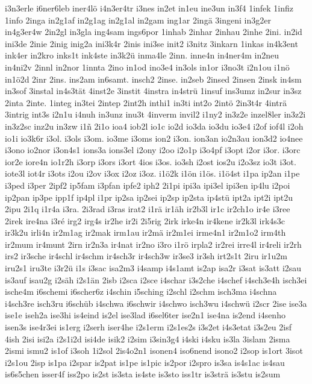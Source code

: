 {i3n3erle
i6ner6leb
iner4lö
i4n3er4tr
i3nes
in2et
in1eu
ine3un
in3f4
1infek
1infiz
1info
2inga
in2g1af
in2g1ag
in2g1al
in2gam
ing1ar
2ingä
3ingeni
in3g2er
in4g3er4w
2in2gl
in3gla
ing4sam
ings6por
1inhab
2inhar
2inhau
2inhe
2ini.
in2id
ini3de
2inie
2inig
inig2a
ini3k4r
2inis
ini3se
init2
i3nitz
3inkarn
1inkas
in4k3ent
ink4er
in2kro
inks1t
ink4ste
in3k2ü
inma4le
2inn.
inne4n
in4ner4m
in2neu
in4ni2v
2innl
in2nor
1innta
2ino
in1od
ino3e4
in3ols
in1or
i3no3t
i2n1ou
i1nö
in1ö2d
2inr
2ins.
ins2am
in6samt.
insch2
2inse.
in2seb
2insed
2insen
2insk
in4sm
in3sof
3instal
in4s3tät
4inst2e
3instit
4instra
in4strü
1insuf
ins3umz
in2sur
in3sz
2inta
2inte.
1integ
in3tei
2intep
2int2h
inthi1
in3ti
int2o
2intö
2in3t4r
4inträ
3intrig
int3s
i2n1u
i4nuh
in3unz
inu3t
4inverm
invil2
i1ny2
in3z2e
inzel8ler
in3z2i
in3z2sc
inz2u
in3zw
i1ñ
2i1o
ioa4
iob2l
io1c
io2d
io3da
io3du
io3e4
i2of
iof4l
i2oh
io1i
io3k6r
i3ol.
i3ols
i3om.
io3me
i3oms
ion2
i3on.
ion3an
io2n3au
ion3d2
io4nee
i3ono
io2nor
i3on4s1
ions3a
ions3el
i2ony
i2oo
i2o1p
i3o4pf
i3opt
i2or
i3or.
i3orc
ior2e
iore4n
io1r2h
i3orp
i3ors
i3ort
4ios
i3os.
io3sh
i2ost
ios2u
i2o3sz
io3t
i3ot.
iote3l
iot4r
i3ots
i2ou
i2ov
i3ox
i2oz
i3oz.
i1ö2k
i1ön
i1ös.
i1ö4st
i1pa
ip2an
i1pe
i3ped
i3per
2ipf2
ip5fam
i3pfan
ipfe2
iph2
2i1pi
ipi3a
ipi3el
ipi3en
ip4lu
i2poi
ip2pan
ip3pe
ipp1f
ip4pl
i1pr
ip2sa
ip2sei
ip2sp
ip2sta
ip4stü
ipt2a
ipt2i
ipt2u
2ipu
2i1q
i1r4a
i3ra.
2i3rad
i3ras
irat2
i1rä
ir1äh
ir2b3l
ir1c
ir2ch1o
ir4e
i3ree
2irek
ire4na
i3ré
irg2
irg4s
ir2he
ir2i
2i5rig
2irk
irke4n
ir4kene
ir2k3l
irk4s3c
ir3k2u
irli4n
ir2m1ag
ir2mak
irm1au
ir2mä
ir2m1ei
irme4n1
ir2m1o2
irm4th
ir2mum
ir4munt
2irn
ir2n3a
ir4nat
ir2no
i3ro
i1rö
irpla2
ir2rei
irre4l
ir4reli
ir2rh
irs2
ir3sche
ir4schl
ir4schm
ir4sch3r
ir4sch3w
ir3se3
ir3sh
irt2s1t
2iru
ir1u2m
iru2s1
iru3te
i3r2ü
i1s
i3sac
isa2m3
i4samp
i4s1amt
is2ap
isa2r
i3sat
is3att
i2sau
is3auf
isau2g
i2säh
i2s1än
2isb
i2sca
i2sce
i4schar
i3s2che
i4schef
i4sch3e4h
isch3ei
ische4m
i6schemi
i6scher6z
i4schin
i5sching
i2schl
i2schm
isch3ma
i4schna
i4sch3re
isch3ru
i6schüb
i4schwa
i6schwir
i4schwo
isch3wu
i4schwü
i2scr
2ise
ise3a
ise1e
iseh2a
ise3hi
is4eind
is2el
ise3lad
i6sel6ter
ise2n1
ise4na
is2end
i4senho
isen3s
ise4r3ei
is1erg
i2serh
iser4he
i2s1erm
i2s1es2s
i3s2et
i4s3etat
i3s2eu
2isf
4ish
2isi
isi2a
i2s1i2d
isi4de
isik2
i2sim
i3sin3g4
i4ski
i4sku
is3la
3islam
2isma
2ismi
ismu2
is1of
i3soh
1i2sol
2is4o2n1
isonen4
iso6nend
isono2
i2sop
is1ort
3isot
i2s1ou
2isp
is1pa
i2spar
is2pat
is1pe
is1pic
is2por
i2spro
is3sa
is4s1ac
is4sau
is6s5chen
isser4f
iss2po
is2st
is3sta
is4ste
is3sto
iss1tr
is3strä
is3stu
is2sum
}
